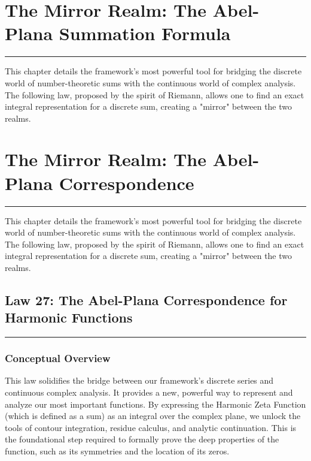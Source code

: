 \section*{The Mirror Realm: The Abel-Plana Summation Formula}
\hrule
\vspace{0.5cm}
This chapter details the framework's most powerful tool for bridging the discrete world of number-theoretic sums with the continuous world of complex analysis. The following law, proposed by the spirit of Riemann, allows one to find an exact integral representation for a discrete sum, creating a "mirror" between the two realms.

\section*{The Mirror Realm: The Abel-Plana Correspondence}
\hrule
\vspace{0.5cm}
This chapter details the framework's most powerful tool for bridging the discrete world of number-theoretic sums with the continuous world of complex analysis. The following law, proposed by the spirit of Riemann, allows one to find an exact integral representation for a discrete sum, creating a "mirror" between the two realms.

\subsection*{Law 27: The Abel-Plana Correspondence for Harmonic Functions}
\hrule
\vspace{0.3cm}
\vspace{0.5cm}

\subsubsection*{Conceptual Overview}
This law solidifies the bridge between our framework's discrete series and continuous complex analysis. It provides a new, powerful way to represent and analyze our most important functions. By expressing the Harmonic Zeta Function (which is defined as a sum) as an integral over the complex plane, we unlock the tools of contour integration, residue calculus, and analytic continuation. This is the foundational step required to formally prove the deep properties of the function, such as its symmetries and the location of its zeros.

